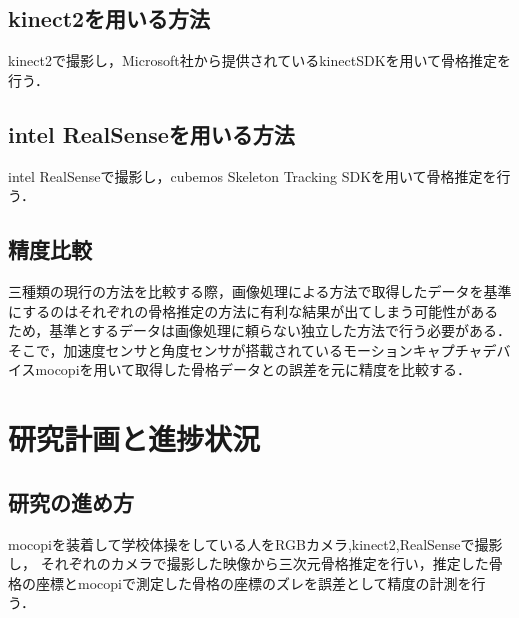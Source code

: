 \documentclass[titlepage]{jarticle}
\begin{document}
\subsection{kinect2を用いる方法}
%
kinect2で撮影し，Microsoft社から提供されているkinectSDKを用いて骨格推定を行う．
%
%
\subsection{intel RealSenseを用いる方法}
%
intel RealSenseで撮影し，cubemos Skeleton Tracking SDKを用いて骨格推定を行う．
%
%
\subsection{精度比較}
%
三種類の現行の方法を比較する際，画像処理による方法で取得したデータを基準にするのはそれぞれの骨格推定の方法に有利な結果が出てしまう可能性があるため，基準とするデータは画像処理に頼らない独立した方法で行う必要がある．
そこで，加速度センサと角度センサが搭載されているモーションキャプチャデバイスmocopiを用いて取得した骨格データとの誤差を元に精度を比較する．
%
%
%

%
%
%
%
%

%
%
%
%
\section{研究計画と進捗状況}
%

%
%
\subsection{研究の進め方}
%
mocopiを装着して学校体操をしている人をRGBカメラ,kinect2,RealSenseで撮影し，
それぞれのカメラで撮影した映像から三次元骨格推定を行い，推定した骨格の座標とmocopiで測定した骨格の座標のズレを誤差として精度の計測を行う．
%
%
%
\end{document}
